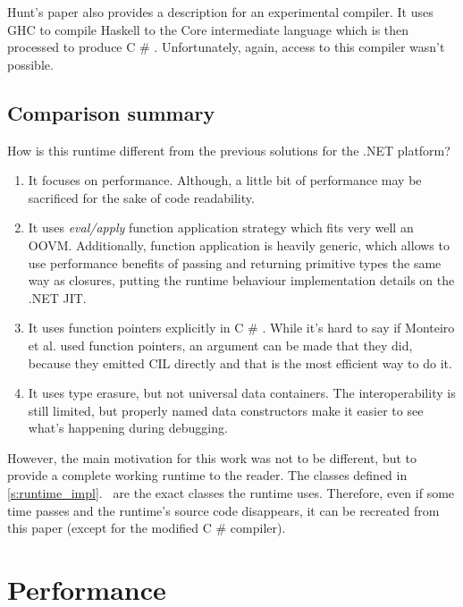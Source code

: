 \documentclass[en]{pracamgr}
\newcommand{\shrp}{%
  {\fontfamily{ppl}\selectfont\#%
  }}
\newcommand{\myref}[1]{\ref{#1}.~\textit{\nameref{#1}}}
\begin{document}
Hunt's paper also provides a description for an experimental
compiler. It uses GHC to compile Haskell to the Core
intermediate language which is then processed to produce C\shrp{}.
Unfortunately, again, access to this compiler wasn't possible.

\section{Comparison summary}

How is this runtime different from the previous solutions for the .NET platform?

\begin{enumerate}
    \item It focuses on performance. Although, a little bit of performance
            may be sacrificed for the sake of code readability.
    \item It uses \textit{eval/apply} function application strategy
            which fits very well an OOVM. Additionally, function application
            is heavily generic, which allows to use performance benefits of
            passing and returning primitive types the same way as closures,
            putting the runtime behaviour implementation details on the .NET JIT.
    \item It uses function pointers explicitly in C\shrp{}. While it's hard to
            say if Monteiro et al. used function pointers, an argument can be made
            that they did, because they emitted CIL directly and that is the most
            efficient way to do it.
    \item It uses type erasure, but not universal data containers. The interoperability
            is still limited, but properly named data constructors make it
            easier to see what's happening during debugging.
\end{enumerate}

However, the main motivation for this work was not to be different, but
to provide a complete working runtime to the reader. The classes defined
in \myref{s:runtime_impl} are the exact classes the runtime uses. Therefore,
even if some time passes and the runtime's source code disappears, it can be recreated
from this paper (except for the modified C\shrp{} compiler).

\chapter{Performance}\label{r:perf}
\end{document}
